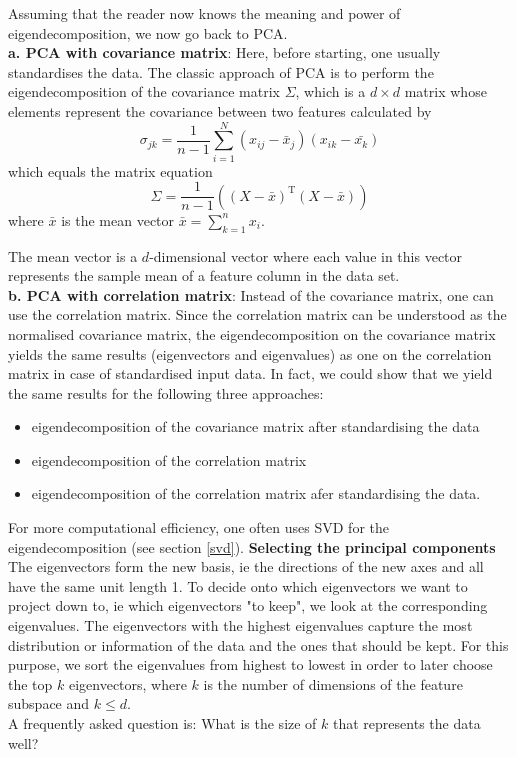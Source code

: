 Assuming that the reader now knows the meaning and power of eigendecomposition, we now go back to PCA.\\
\textbf{a. PCA with covariance matrix}:
Here, before starting, one usually standardises the data. %
The classic approach of PCA is to perform the eigendecomposition of the covariance matrix \( \Sigma \), which is a \( d \times d \) matrix whose elements represent the covariance between two features calculated by 
\[
\sigma_{jk} = \frac{1}{n-1} \sum_{i=1}^{N} (x_{ij} - \bar{x}_{j}) (x_{ik} - \bar{x_{k}})
\]
which equals the matrix equation
\[
\Sigma = \frac{1}{n-1} ( (X - \bar{x})^{\text{T}} (X - \bar{x}) )
\]
where \( \bar{x }\) is the mean vector \( \bar{x}= \sum_{k=1}^{n} x_{i}  \).

The mean vector is a \(d\)-dimensional vector where each value in this vector represents the sample mean of a feature column in the data set.\\
\textbf{b. PCA with correlation matrix}: 
Instead of the covariance matrix, one can use the correlation matrix. 
Since the correlation matrix can be understood as the normalised covariance matrix, the eigendecomposition on the covariance matrix yields the same results (eigenvectors and eigenvalues) as one on the correlation matrix in case of standardised input data. 
In fact, we could show that we yield the same results for the following three approaches:
\begin{itemize}
\item eigendecomposition of the covariance matrix after standardising the data
\item eigendecomposition of the correlation matrix
\item eigendecomposition of the correlation matrix afer standardising the data.
\end{itemize}
For more computational efficiency, one often uses SVD for the eigendecomposition (see section \ref{svd}).
\newline
%
\textbf{Selecting the principal components}\\
The eigenvectors form the new basis, ie the directions of the new axes and all have the same unit length 1. To decide onto which eigenvectors we want to project down to, ie which eigenvectors "to keep", we look at the corresponding eigenvalues. The eigenvectors with the highest eigenvalues capture the most distribution or information of the data and the ones that should be kept. 
For this purpose, we sort the eigenvalues from highest to lowest in order to later choose the top \( k \) eigenvectors, where \( k \) is the number of dimensions of the feature subspace and \( k \leq d \). \\
A frequently asked question is: What is the size of \( k \) that represents the data well?

